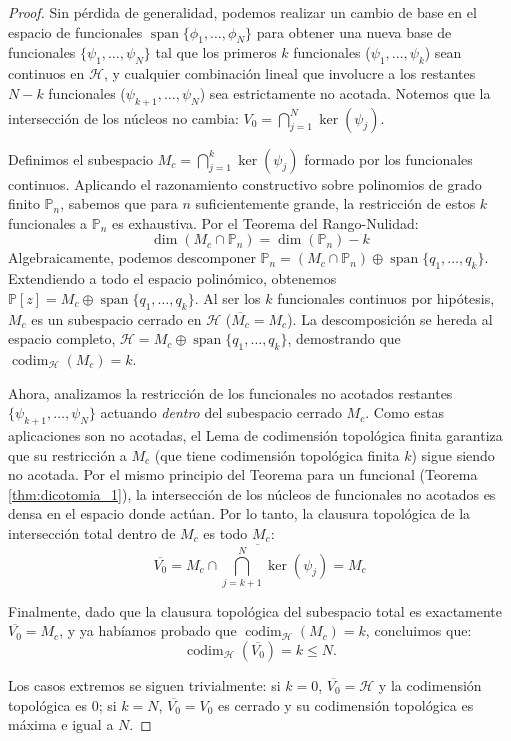 \documentclass[12pt,a4paper]{article}
\theoremstyle{definition}
\theoremstyle{remark}
\begin{document}
\begin{proof}
	Sin pérdida de generalidad, podemos realizar un cambio de base en el espacio de funcionales $\operatorname{span}\{\phi_1, \dots, \phi_N\}$ para obtener una nueva base de funcionales $\{\psi_1, \dots, \psi_N\}$ tal que los primeros $k$ funcionales ($\psi_1, \dots, \psi_k$) sean continuos en $\mathcal{H}$, y cualquier combinación lineal que involucre a los restantes $N-k$ funcionales ($\psi_{k+1}, \dots, \psi_N$) sea estrictamente no acotada. Notemos que la intersección de los núcleos no cambia: $V_0 = \bigcap_{j=1}^N \ker(\psi_j)$.

	Definimos el subespacio $M_c = \bigcap_{j=1}^k \ker(\psi_j)$ formado por los funcionales continuos.
	Aplicando el razonamiento constructivo sobre polinomios de grado finito $\mathbb{P}_n$, sabemos que para $n$ suficientemente grande, la restricción de estos $k$ funcionales a $\mathbb{P}_n$ es exhaustiva. Por el Teorema del Rango-Nulidad:
	$$ \dim(M_c \cap \mathbb{P}_n) = \dim(\mathbb{P}_n) - k $$
	Algebraicamente, podemos descomponer $\mathbb{P}_n = (M_c \cap \mathbb{P}_n) \oplus \operatorname{span}\{q_1, \dots, q_k\}$. Extendiendo a todo el espacio polinómico, obtenemos $\mathbb{P}[z] = M_c \oplus \operatorname{span}\{q_1, \dots, q_k\}$.
	Al ser los $k$ funcionales continuos por hipótesis, $M_c$ es un subespacio cerrado en $\mathcal{H}$ ($\overline{M_c} = M_c$). La descomposición se hereda al espacio completo, $\mathcal{H} = M_c \oplus \operatorname{span}\{q_1, \dots, q_k\}$, demostrando que $\operatorname{codim}_\mathcal{H}(M_c) = k$.

	Ahora, analizamos la restricción de los funcionales no acotados restantes $\{\psi_{k+1}, \dots, \psi_N\}$ actuando \textit{dentro} del subespacio cerrado $M_c$.
	Como estas aplicaciones son no acotadas, el Lema de codimensión topológica finita garantiza que su restricción a $M_c$ (que tiene codimensión topológica finita $k$) sigue siendo no acotada.
	Por el mismo principio del Teorema para un funcional (Teorema \ref{thm:dicotomia_1}), la intersección de los núcleos de funcionales no acotados es densa en el espacio donde actúan.
	Por lo tanto, la clausura topológica de la intersección total dentro de $M_c$ es todo $M_c$:
	$$ \overline{V_0} = \overline{M_c \cap \bigcap_{j=k+1}^N \ker(\psi_j)} = M_c $$

	Finalmente, dado que la clausura topológica del subespacio total es exactamente $\overline{V_0} = M_c$, y ya habíamos probado que $\operatorname{codim}_\mathcal{H}(M_c) = k$, concluimos que:
	$$ \operatorname{codim}_\mathcal{H}(\overline{V_0}) = k \le N. $$

	Los casos extremos se siguen trivialmente: si $k=0$, $\overline{V_0} = \mathcal{H}$ y la codimensión topológica es 0; si $k=N$, $\overline{V_0} = V_0$ es cerrado y su codimensión topológica es máxima e igual a $N$.
\end{proof}
\end{document}
